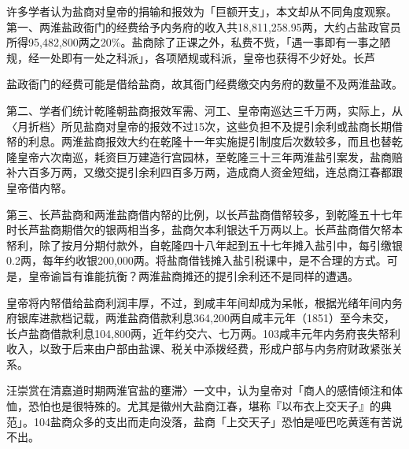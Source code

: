 许多学者认为盐商对皇帝的捐输和报效为「巨额开支」，本文却从不同角度观察。第一、两淮盐政衙门的经费给予内务府的收入共18,811,258.95两，大约占盐政官员所得95,482,800两之20\%。盐商除了正课之外，私费不赀，「遇一事即有一事之陋规，经一处即有一处之科派」，各项陋规或科派，皇帝也获得不少好处。长芦

\vfill
\begin{BookNotes}
\end{BookNotes}

\noindent 盐政衙门的经费可能是借给盐商，故其衙门经费缴交内务府的数量不及两淮盐政。

第二、学者们统计乾隆朝盐商报效军需、河工、皇帝南巡达三千万两，实际上，从〈月折档〉所见盐商对皇帝的报效不过15次，这些负担不及提引余利或盐商长期借帑的利息。两淮盐商报效大约在乾隆十一年实施提引制度后次数较多，而且也替乾隆皇帝六次南巡，耗资巨万建造行宫园林，至乾隆三十三年两淮盐引案发，盐商赔补六百多万两，又缴交提引余利四百多万两，造成商人资金短绌，连总商江春都跟皇帝借内帑。

第三、长芦盐商和两淮盐商借内帑的比例，以长芦盐商借帑较多，到乾隆五十七年时长芦盐商期借欠的银两相当多，盐商欠本利银达千万两以上。长芦盐商借欠帑本帑利，除了按月分期付款外，自乾隆四十八年起到五十七年摊入盐引中，每引缴银0.2两，每年约收银200,000两。将盐商借钱摊入盐引税课中，是不合理的方式。可是，皇帝谕旨有谁能抗衡？两淮盐商摊还的提引余利还不是同样的遭遇。

皇帝将内帑借给盐商利润丰厚，不过，到咸丰年间却成为呆帐，根据光绪年间内务府银库进款档记载，两淮盐商借款利息364,200两自咸丰元年（1851）至今未交，长卢盐商借款利息104,800两，近年约交六、七万两。103咸丰元年内务府丧失帑利收入，以致于后来由户部由盐课、税关中添拨经费，形成户部与内务府财政紧张关系。

汪崇赏在清嘉道时期两淮官盐的壅滞〉一文中，认为皇帝对「商人的感情倾注和体恤，恐怕也是很特殊的。尤其是徽州大盐商江春，堪称『以布衣上交天子』的典范」。104盐商众多的支出而走向没落，盐商「上交天子」恐怕是哑巴吃黄莲有苦说不出。

\vfill
\begin{BookNotes}
\end{BookNotes}




